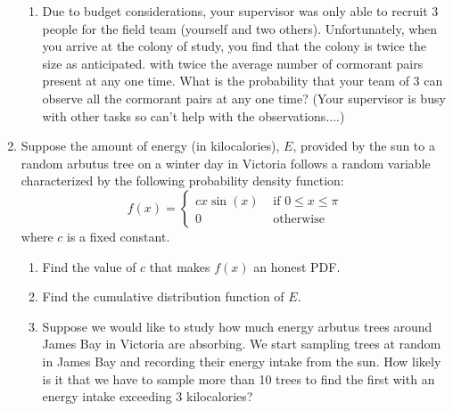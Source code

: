 \documentclass[11pt]{article}
\begin{document}
\begin{enumerate}[label=\textbf{Question \arabic*:},start=1]
\begin{enumerate}
\item Due to budget considerations, your supervisor was only able to recruit 3 people for the field team (yourself and two others). Unfortunately, when you arrive at the colony of study, you find that the colony is twice the size as anticipated. with twice the average number of cormorant pairs present at any one time. What is the probability that your team of 3 can observe all the cormorant pairs at any one time? (Your supervisor is busy with other tasks so can't help with the observations....) 
\end{enumerate}




\item Suppose the amount of energy (in kilocalories), $E$, provided by the sun to a random arbutus tree on a winter day in Victoria follows a random variable characterized by the following probability density function:
\[
f(x) = \left\{
\begin{array}{ll}
cx\sin(x) & \mbox{ if } 0\leq x\leq \pi \\
0 & \mbox{ otherwise} 
\end{array}
\right.
\]
where $c$ is a fixed constant. 
\begin{enumerate}
  \item Find the value of $c$ that makes $f(x)$ an honest PDF.\\

  \item Find the cumulative distribution function of $E$.\\

  \item Suppose we would like to study how much energy arbutus trees around James Bay in Victoria are absorbing. We start sampling trees at random in James Bay and recording their energy intake from the sun. How likely is it that we have to sample more than 10 trees to find the first with an energy intake exceeding 3 kilocalories?


\end{enumerate}

\end{enumerate}
\end{document}
